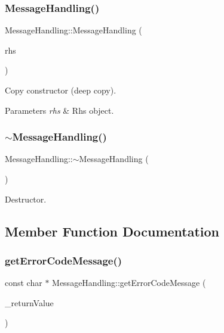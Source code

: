 \subsubsection{\texorpdfstring{Message\+Handling()}{MessageHandling()}\hspace{0.1cm}{\footnotesize\ttfamily [5/5]}}
{\footnotesize\ttfamily Message\+Handling\+::\+Message\+Handling (\begin{DoxyParamCaption}\item[{const \hyperlink{class_message_handling}{Message\+Handling} \&}]{rhs }\end{DoxyParamCaption})}

Copy constructor (deep copy). 
\begin{DoxyParams}{Parameters}
{\em rhs} & Rhs object. \\
\hline
\end{DoxyParams}
\mbox{\label{class_message_handling_a732439c8915c726c29833a335fb60ae7}} 
\subsubsection{\texorpdfstring{$\sim$\+Message\+Handling()}{~MessageHandling()}}
{\footnotesize\ttfamily Message\+Handling\+::$\sim$\+Message\+Handling (\begin{DoxyParamCaption}{ }\end{DoxyParamCaption})}

Destructor. 

\subsection{Member Function Documentation}
\mbox{\label{class_message_handling_aa6107f3844b0d91478daec1301620560}} 
\subsubsection{\texorpdfstring{get\+Error\+Code\+Message()}{getErrorCodeMessage()}}
{\footnotesize\ttfamily const char $\ast$ Message\+Handling\+::get\+Error\+Code\+Message (\begin{DoxyParamCaption}\item[{const \hyperlink{_message_handling_8hpp_a81d556f613bfbabd0b1f9488c0fa865e}{return\+Value}}]{\+\_\+return\+Value }\end{DoxyParamCaption})\hspace{0.3cm}{\ttfamily [static]}}

